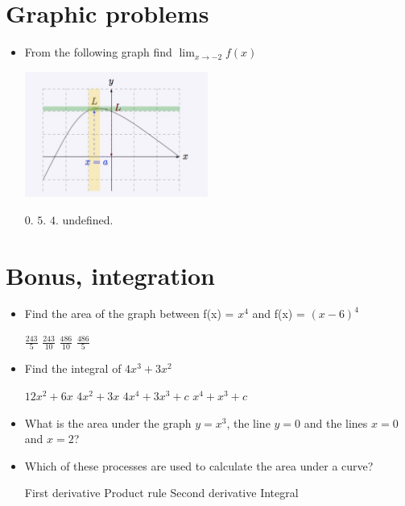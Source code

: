 \documentclass{exam}
\begin{document}
\section{Graphic problems}

\begin{itemize}
	\item
	From the following graph find $\lim_{x \to -2 } f(x)$
	\par\nopagebreak
	\includegraphics[width = 6cm]{limgraph.jpg}

	\begin{choices}
		\choice $0$.
		\choice $5$.
		\choice $4$.
		\CorrectChoice undefined.
	\end{choices}

\end{itemize}


\section{Bonus, integration}

\begin{itemize}
	\item Find the area of the graph between f(x) = $x^4$ and f(x) = $(x-6)^4$

	\begin{choices}
		\choice $\frac{243}{5}$
		\choice $\frac{243}{10}$
		\choice $\frac{486}{10}$
		\CorrectChoice $\frac{486}{5}$
	\end{choices}
	\item Find the integral of $ 4x^3+3x^2 $

	\begin{choices}
		\choice $12x^2 + 6x$
		\choice $4x^2 + 3x$
		\choice $4x^4 + 3x^3 + c$
		\CorrectChoice $x^4 + x^3 +c$
	\end{choices}
	\item What is the area under the graph $y = x^3$, the line $y = 0$ and the lines $x=0$ and $x=2$?

	\begin{choices}
		\choice 8
		\choice 16
		\choice 24
		\CorrectChoice 4
	\end{choices}
	\item Which of these processes are used to calculate the area under a curve?
	\begin{choices}
		\choice First derivative
		\choice Product rule
		\choice Second derivative
		\CorrectChoice Integral
	\end{choices}




\end{itemize}
\end{document}
